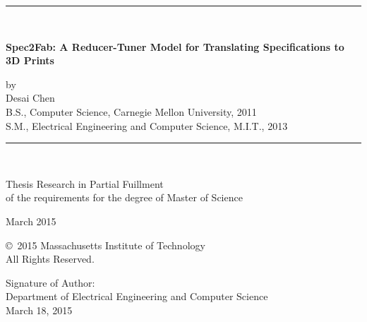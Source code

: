 

\thispagestyle{empty}

\begin{centering}
\rule{\textwidth}{.05in}\\ \vspace{.10in}

\Large \textbf{\textsf{ Spec2Fab: A Reducer-Tuner Model for Translating Specifications to 3D Prints
}} \\
\normalsize

\vspace{.1in}
by \\

\vspace{.1in}
Desai Chen\\

\vspace{.1in} B.S., Computer Science,
Carnegie Mellon University, 2011 \\

\vspace{.0in} S.M., Electrical Engineering and Computer Science,
M.I.T., 2013 \\

\vspace{.1in}
\rule{\textwidth}{.05in}\\

\vspace{.2in}

Thesis Research in Partial Fuillment\\
of the requirements for the degree of Master of Science\\

\vspace{.15in}

\vspace{.1in} March 2015

\vspace{.15in} \copyright\ 2015
Massachusetts Institute of Technology \\
All Rights Reserved. \\

\end{centering}

\vspace{.3in}

\noindent
Signature of Author: \underline{\mbox{\hspace{4.28in}}} \\
\vspace{-.25in}
{\flushright Department of Electrical Engineering and Computer Science \\
March 18, 2015\\
}

